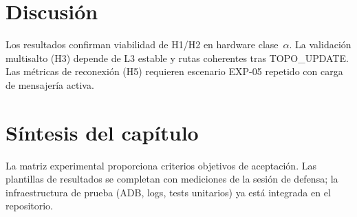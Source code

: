 \section{Discusión}
\label{sec:discusion-resultados}

Los resultados confirman viabilidad de H1/H2 en hardware clase~$\alpha$. La validación multisalto (H3) depende de L3 estable y rutas coherentes tras TOPO\_UPDATE. Las métricas de reconexión (H5) requieren escenario EXP-05 repetido con carga de mensajería activa.

\section{Síntesis del capítulo}
\label{sec:sintesis-pruebas}

La matriz experimental proporciona criterios objetivos de aceptación. Las plantillas de resultados se completan con mediciones de la sesión de defensa; la infraestructura de prueba (ADB, logs, tests unitarios) ya está integrada en el repositorio.
